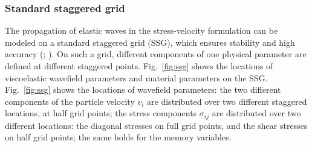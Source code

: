 \subsubsection{Standard staggered grid}
\label{ssg}
The propagation of elastic waves in the stress-velocity formulation can be modeled on a standard staggered grid (SSG), which ensures stability and high accuracy (\cite{virieux:86}; \cite{levander:88}). On such a grid, different components of one physical parameter are defined at different staggered points. Fig.~\ref{fig:ssg} shows the locations of viscoelastic wavefield parameters and material parameters on the SSG. Fig.~\ref{fig:ssg} shows the locations of wavefield parameters: the two different components of the particle velocity $v_i$ are distributed over two different staggered locations, at half grid points; the stress components $\sigma_{ij}$ are distributed over two different locations: the diagonal stresses on full grid points, and the shear stresses on half grid points; the same holds for the memory variables.

